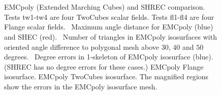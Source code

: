 \begin{figure}
	\centering
	\\
	\\
\caption{EMCpoly (Extended Marching Cubes) and SHREC comparison.
Tests tw1-tw4 are four TwoCubes scalar fields.
Tests fl1-fl4 are four Flange scalar fields.
\protect{}~Maximum angle distance for EMCpoly (blue)
and SHEC (red).
\protect{}~Number of triangles in EMCpoly isosurfaces
with oriented angle difference to polygonal mesh 
above $30$, $40$ and $50$ degrees.
\protect{}~Degree errors 
in 1-skeleton of EMCpoly isosurface (blue).
(SHREC has no degree errors for these cases.)
\protect{} EMCpoly Flange isosurface.
\protect{} EMCpoly TwoCubes isosurface.
The magnified regions show the errors in the EMCpoly isosurface mesh.}	
\end{figure}


